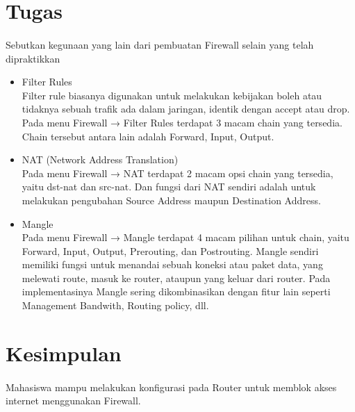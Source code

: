 \documentclass[a4paper,12pt]{article}
\begin{document}
\newpage

\section{Tugas}
\paragraph{}
Sebutkan kegunaan yang lain dari pembuatan Firewall selain yang telah dipraktikkan
\begin{itemize}
    \item Filter Rules\\
    Filter rule biasanya digunakan untuk melakukan kebijakan boleh atau tidaknya sebuah trafik ada dalam jaringan, identik dengan accept atau drop. Pada menu Firewall → Filter Rules terdapat 3 macam chain yang tersedia. Chain tersebut antara lain adalah Forward, Input, Output.

    \item NAT (Network Address Translation)\\
    Pada menu Firewall → NAT terdapat 2 macam opsi chain yang tersedia, yaitu dst-nat dan src-nat. Dan fungsi dari NAT sendiri adalah untuk melakukan pengubahan Source Address maupun Destination Address.

    \item Mangle\\
    Pada menu Firewall → Mangle terdapat 4 macam pilihan untuk chain, yaitu Forward, Input, Output, Prerouting, dan Postrouting. Mangle sendiri memiliki fungsi untuk menandai sebuah koneksi atau paket data, yang melewati route, masuk ke router, ataupun yang keluar dari router. Pada implementasinya Mangle sering dikombinasikan dengan fitur lain seperti Management Bandwith, Routing policy, dll.
\end{itemize}

\section{Kesimpulan}
\paragraph{}
Mahasiswa mampu melakukan konfigurasi pada Router untuk memblok akses internet menggunakan Firewall.
\end{document}
